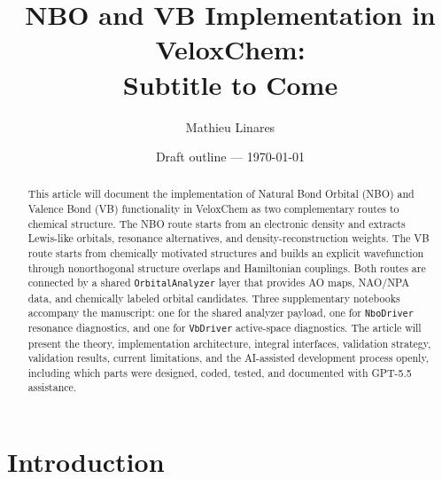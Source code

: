 \documentclass[11pt]{article}
\title{NBO and VB Implementation in VeloxChem:\\Subtitle to Come}
\author{Mathieu Linares}
\date{Draft outline --- \today}
\begin{document}
\maketitle

\begin{abstract}
This article will document the implementation of Natural Bond Orbital (NBO) and Valence Bond (VB) functionality in VeloxChem as two complementary routes to chemical structure.  The NBO route starts from an electronic density and extracts Lewis-like orbitals, resonance alternatives, and density-reconstruction weights.  The VB route starts from chemically motivated structures and builds an explicit wavefunction through nonorthogonal structure overlaps and Hamiltonian couplings.  Both routes are connected by a shared \texttt{OrbitalAnalyzer} layer that provides AO maps, NAO/NPA data, and chemically labeled orbital candidates.  Three supplementary notebooks accompany the manuscript: one for the shared analyzer payload, one for \texttt{NboDriver} resonance diagnostics, and one for \texttt{VbDriver} active-space diagnostics.  The article will present the theory, implementation architecture, integral interfaces, validation strategy, validation results, current limitations, and the AI-assisted development process openly, including which parts were designed, coded, tested, and documented with GPT-5.5 assistance.
\end{abstract}

\tableofcontents

\section{Introduction}
\end{document}
